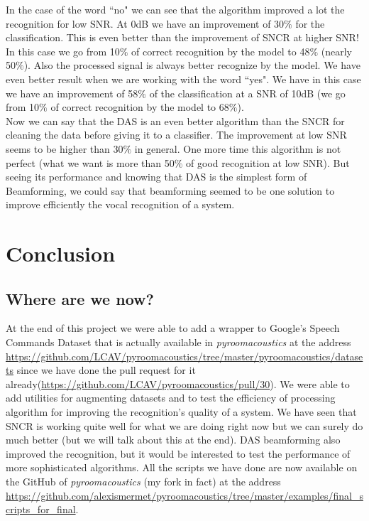 \documentclass[11pt,a4paper,titlepage]{report}
\begin{document}
In the case of the word ``no" we can see that the algorithm improved a lot the recognition for low SNR. At 0dB we have an improvement of 30$\%$ for the classification. This is even better than the improvement of SNCR at higher SNR! In this case we go from 10$\%$ of correct recognition by the model to 48$\%$ (nearly 50$\%$). Also the processed signal is always better recognize by the model. We have even better result when we are working with the word ``yes". We have in this case we have an improvement of 58$\%$ of the classification at a SNR of 10dB (we go from 10$\%$ of correct recognition by the model to 68$\%$).\\
Now we can say that the DAS is an even better algorithm than the SNCR for cleaning the data before giving it to a classifier. The improvement at low SNR seems to be higher than 30$\%$ in general. One more time this algorithm is not perfect (what we want is more than 50$\%$ of good recognition at low SNR). But seeing its performance and knowing that DAS is the simplest form of Beamforming, we could say that beamforming seemed to be one solution to improve efficiently the vocal recognition of a system.
\chapter{Conclusion}
\section{Where are we now?}
\hspace*{0.6cm}
At the end of this project we were able to add a wrapper to Google's Speech Commands Dataset that is actually available in \textit{pyroomacoustics} at the address \url{https://github.com/LCAV/pyroomacoustics/tree/master/pyroomacoustics/datasets} since we have done the pull request for it already(\url{https://github.com/LCAV/pyroomacoustics/pull/30}). We were able to add utilities for augmenting  datasets and to test the efficiency of processing algorithm for improving the recognition's quality of a system. We have seen that SNCR is working quite well for what we are doing right now but we can surely do much better (but we will talk about this at the end). DAS beamforming also improved the recognition, but it would be interested to test the performance of more sophisticated algorithms.
All the scripts we have done are now available on the GitHub of \textit{pyroomacoustics} (my fork in fact) at the address \url{https://github.com/alexismermet/pyroomacoustics/tree/master/examples/final_scripts_for_final}.
\end{document}
